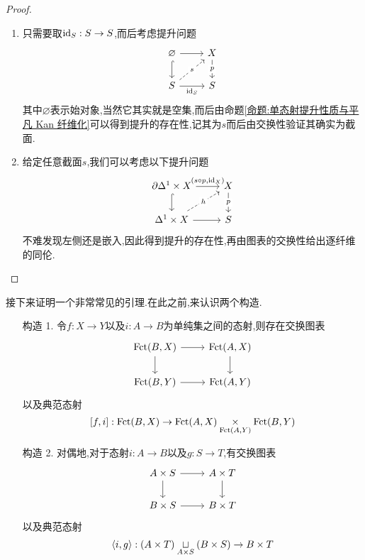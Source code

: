 \begin{proof}
    \begin{enumerate}
        \item 只需要取$\mathrm{id}_S :S\to S$,而后考虑提升问题
        \[\begin{tikzcd}
	    \varnothing & X \\
	    S & S
	    \arrow[from=1-1, to=1-2]
	    \arrow[hook, from=1-1, to=2-1]
	    \arrow["p"{description}, from=1-2, to=2-2]
	    \arrow["s"{description}, dashed, from=2-1, to=1-2]
	    \arrow["{\identity_S}"', from=2-1, to=2-2]
        \end{tikzcd}\]
        其中$\varnothing$表示始对象,当然它其实就是空集,而后由命题\ref{命题:单态射提升性质与平凡 Kan 纤维化}可以得到提升的存在性,记其为$s$而后由交换性验证其确实为截面.
        \item 给定任意截面$s$,我们可以考虑以下提升问题
        \[\begin{tikzcd}
	    {\partial \Delta^1 \times X} & X \\
	    {\Delta^1\times X} & S
	    \arrow["{(s\circ p ,\identity_X)}", from=1-1, to=1-2]
	    \arrow[hook, from=1-1, to=2-1]
	    \arrow["p"{description}, from=1-2, to=2-2]
	    \arrow["h"{description}, dashed, from=2-1, to=1-2]
	    \arrow[from=2-1, to=2-2]
        \end{tikzcd}\]
        不难发现左侧还是嵌入,因此得到提升的存在性,再由图表的交换性给出逐纤维的同伦.
    \end{enumerate}
\end{proof}
接下来证明一个非常常见的引理.在此之前,来认识两个构造.
\begin{enumerate}
    \item[构造 1.] 令$f: X \to Y$以及$i : A \to B$为单纯集之间的态射,则存在交换图表
    \[\begin{tikzcd}
	{\Fct(B,X) } & {\Fct(A,X)} \\
	{\Fct(B,Y)} & {\Fct(A,Y)}
	\arrow[from=1-1, to=1-2]
	\arrow[from=1-1, to=2-1]
	\arrow[from=1-2, to=2-2]
	\arrow[from=2-1, to=2-2]
    \end{tikzcd}\]
    以及典范态射
    \[
    [f,i]:\operatorname{Fct}(B,X) \to \operatorname{Fct}(A,X) \underset{\operatorname{Fct}(A,Y)}{\times} \operatorname{Fct}(B,Y)
    \]
    \item[构造 2.] 对偶地,对于态射$i: A\to B$以及$g : S \to T$,有交换图表
    \[\begin{tikzcd}
	{A\times S} & {A\times T} \\
	{B\times S} & {B\times T}
	\arrow[from=1-1, to=1-2]
	\arrow[from=1-1, to=2-1]
	\arrow[from=1-2, to=2-2]
	\arrow[from=2-1, to=2-2]
    \end{tikzcd}\]
    以及典范态射
    \[
    \left<i,g\right>:(A\times T)\underset{A \times S}{\sqcup} (B \times S) \to B \times T
    \]
\end{enumerate}
